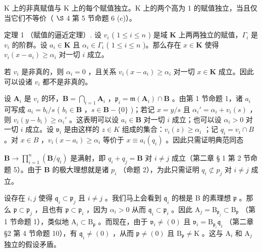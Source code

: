 K 上的非真赋值与 K 上的每个赋值独立。K 上的两个高为 1 的赋值独立，当且仅当它们不等价（ \(\S\) 4 第 5 节命题 6 (c)）。

定理 1 （赋值的逼近定理）. 设 \(v_{i}\) ( \(1 \leqslant i \leqslant n\) ) 是域 \(\mathbf{K}\) 上两两独立的赋值，\(\Gamma_{i}\) 是 \(v_{i}\) 的阶群。设 \(a_{i} \in \mathbf{K}\) 且 \(\alpha_{i} \in \Gamma_{i}\) ( \(1 \leqslant i \leqslant n\) )。那么存在 \(x \in \mathbf{K}\) 使得 \(v_{i}(x - a_{i}) \geqslant \alpha_{i}\) 对一切 \(i\) 成立。

若 \(v_{i}\) 是非真的，则 \(\alpha_{i} = 0\) ，且关系 \(v_{i}(x - a_{i}) \geqslant \alpha_{i}\) 对一切 \(x \in \mathbf{K}\) 成立。因此可以设诸 \(v_{i}\) 都不是非真的。

设 \(\mathbf{A}_i\) 是 \(v_i\) 的环，\(\mathbf{B} = \bigcap_{i=1} \mathbf{A}_i\) ，\(\mathfrak{p}_i = \mathfrak{m}(\mathbf{A}_i) \cap \mathbf{B}\) 。由第 1 节命题 1，诸 \(a_i\) 可写成 \(a_i = b_i / s\) ( \(b_i \in \mathbf{B}\) ，\(s \in \mathbf{B} - \{0\}\) )；若记 \(x = y / s\) 且 \(\alpha_i' = \alpha_i + v_i(s)\) ，则 \(v_i(y - b_i) \geqslant \alpha_i'\) 。这表明可以设 \(a_i \in \mathbf{B}\) 对一切 \(i\) 成立；也可以设 \(\alpha_i > 0\) 对一切 \(i\) 成立。设 \(\mathfrak{v}_i\) 是由这样的 \(z \in K\) 组成的集合：\(v_{i}(z) \geqslant \alpha_{i}\) ；记 \(q_{i} = v_{i} \cap B\) 。对 \(x \in B\) ，\(v_{i}(x - a_{i}) \geqslant \alpha_{i}\) 等价于 \(x \equiv a_{i}(q_{i})\) 。因此只需证明典范同态

\(\mathbf{B} \to \prod_{i=1}^{n} \left( \mathbf{B} / q_i \right)\) 是满射，即 \(q_i + q_j = \mathbf{B}\) 对 \(i \neq j\) 成立（第二章 § 1 第 2 节命题 5）。由于 \(\mathbf{B}\) 的极大理想就是诸 \(p_i\) （命题 2），为此只需证明 \(q_i \not\subset p_j\) 对 \(i \neq j\) 成立。

设存在 \(i, j\) 使得 \(\mathfrak{q}_i \subset \mathfrak{p}_j\) 且 \(i \neq j\) 。我们马上会看到 \(\mathfrak{q}_i\) 的根是 B 的素理想 \(\mathfrak{p}\) 。那么 \(\mathfrak{p} \subset \mathfrak{p}_j\) ，且也有 \(\mathfrak{p} \subset \mathfrak{p}_i\) ，因为 \(\alpha_i > 0\) 从而 \(\mathfrak{q}_i \subset \mathfrak{p}_i\) 。因此 \(\mathrm{A}_j = \mathrm{B}_{\mathfrak{p}_j} \subset \mathrm{B}_{\mathfrak{p}}\) （第 1 节命题 1），类似地 \(\mathrm{A}_i \subset \mathrm{B}_{\mathfrak{p}}\) 。而现在，由于 \(\mathfrak{v}_i \neq (0)\) 且 \(\mathfrak{v}_i = \mathrm{B}_{\mathfrak{p}_i} \mathfrak{q}_i\) （第二章 §2 第 4 节命题 10），有 \(\mathfrak{q}_i \neq (0)\) ，从而 \(\mathfrak{p} \neq (0)\) 且 \(\mathrm{B}_{\mathfrak{p}} \neq \mathrm{K}\) 。这与 \(\mathrm{A}_i\) 和 \(\mathrm{A}_j\) 独立的假设矛盾。

